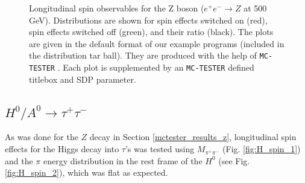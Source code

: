 \documentclass[]{Tauola_interface_design}
\begin{document}
\begin{figure}[h!]
\centering
{}
\caption{Longitudinal spin observables for the Z boson ($e^+e^- \rightarrow Z$ at 500 GeV).
Distributions are shown for spin effects switched on (red), spin effects switched off (green), and their ratio (black). The plots are given 
 in the default  format of our example programs 
(included in the distribution tar ball). 
They are  produced with the help of  {\tt MC-TESTER} \cite{Davidson:2008ma}.
Each plot is supplemented by an {\tt MC-TESTER} defined titlebox and SDP parameter.
}
\end{figure}



\subsection{$H^0/A^0 \rightarrow \tau^+ \tau^-$}
\label{subsection:HA}
As was done for the $Z$ decay in Section \ref{mctester_results_z}, longitudinal spin 
effects for the Higgs decay into $\tau$'s was tested using $M_{\pi^+\pi^-}$ (Fig. \ref{fig:H_spin_1}) 
and the $\pi$ energy distribution in the rest frame of the $H^0$ (see Fig. \ref{fig:H_spin_2}),
which was flat as expected.
\end{document}
